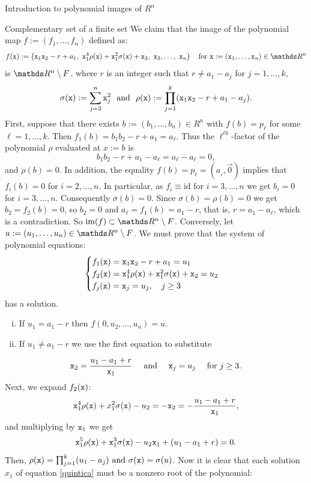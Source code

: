 \documentclass[11pt, a4paper, english, twoside, notitlepage, openright]{report}
\begin{document}
\begin{chapter}{Introduction to polynomial images of $R^n$}
\begin{section}{Complementary set of a finite set}
We claim that the image of the polynomial map $f:=(f_1,\dots,f_n)$ defined as:
$$
f({\tt x}):=\left({\tt x}_1{\tt x}_2-r+a_1,\ {\tt x}_1^{4}\rho({\tt x})+{\tt x}_1^{2}\sigma({\tt x})+{\tt x}_2,\ {\tt x}_3,\dots,\ {\tt x}_n\right)\quad\text{for ${\tt x}:=({\tt x}_1,\ldots,{\tt x}_n)\in\R^n$}
$$
is $\R^n\setminus F$, where $r$ is an integer such that $r\neq a_1-a_j$ for $j=1,\dots,k$,  
$$
\sigma({\tt x}):=\sum_{j=3}^n{\tt x}_j^2 \, \, \text{ and } \, \, \rho({\tt x}):=\prod_{j=1}^k({\tt x}_1{\tt x}_2-r+a_1-a_j).
$$
First, suppose that there exists $b:=(b_{1},\dots,b_{n})\in R^n$ with $f(b)=p_\ell$ for some $\ell=1,\dots,k$. Then $f_1(b)=b_1b_2-r+a_1=a_\ell$. Thus the $\ell^{th}$-factor of the polynomial $\rho$ evaluated at $x:=b$ is
$$
b_1b_2-r+a_1-a_\ell=a_\ell-a_\ell=0,
$$		 
and $\rho(b)=0$. In addition, the equality $f(b)=p_\ell=(a_{_\ell},\vec{0})$ implies that $f_i(b)=0$ for $i=2,\dots,n$. In particular, as $f_i\equiv\text{id}$ for $i=3,\dots,n$ we get $b_i=0$ for $i=3,\dots,n$. Consequently $\sigma(b)=0$. Since $\sigma(b)=\rho(b)=0$ we get $b_2=f_2(b)= 0$, so $b_2=0$ and $a_{\ell}=f_1(b)=a_1-r$, that is, $r=a_1-a_\ell$, which is a contradiction. So $\text{im}(f)\subset \R^n\setminus F$.
Conversely, let $u:=(u_1,\dots,u_n)\in\R^n\setminus F$. We must prove that the system of polynomial equations:
\[ \begin{cases} 
f_1({\tt x})={\tt x}_1{\tt x}_2-r+a_1=u_1 \\
f_2({\tt x})={\tt x}_1^4\rho({\tt x})+{\tt x}_1^2\sigma({\tt x})+{\tt x}_2=u_2 \\
f_j({\tt x})={\tt x}_j=u_j,\quad j\geq 3
\end{cases}  \]
has a solution.
\begin{enumerate}[(i)]
\item If $u_1=a_1-r$ then $f(0,u_2,\dots,u_n)=u$.
\item If $u_1\neq a_1-r$ we use the first equation to substitute 
\end{enumerate}
$$
{\tt x}_2=\frac{u_1-a_1+r}{{\tt x}_1} \quad \text{ and } \quad {\tt x}_j=u_j \quad \text{ for } j\geq 3.
$$ 
Next, we expand $f_2({\tt x})$:
$$
{\tt x}_1^4\rho({\tt x})+x_1^2\sigma({\tt x})-u_2=-{\tt x}_2=-\frac{u_1-a_1+r}{{\tt x}_1},
$$ 
and multiplying by ${\tt x}_1$ we get 
\begin{equation}\label{quintica}
{\tt x}_1^5\rho({\tt x})+{\tt x}_1^3\sigma({\tt x})-u_2{\tt x}_1+(u_1-a_1+r)=0.
\end{equation}
Then, $\rho({\tt x})=\prod_{j=1}^k(u_1-a_j) \text{ and } \sigma({\tt x})=\sigma(u)$. Now it is clear that each solution $x_1$ of equation \eqref{quintica} must be a nonzero root of the polynomial:

\end{section}
\end{chapter}
\end{document}
